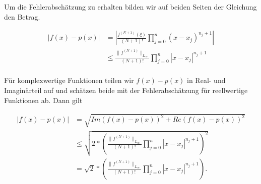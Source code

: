 \documentclass[]{article}
\begin{document}
Um die Fehlerabschätzung zu erhalten bilden wir auf beiden Seiten der Gleichung den Betrag.

\begin{align*}
	|f(x)-p(x)| &= \left| \frac{f^{(N+1)}(\xi)}{(N+1)!} \prod_{j=0}^{n}(x-x_j)^{n_j+1}\right| \\
	& \leq \frac{\|f^{(N+1)}\|_{L_\infty}}{(N+1)!} \prod_{j=0}^{n}|x-x_j|^{n_j+1} \\
\end{align*}

Für komplexwertige Funktionen teilen wir $f(x)-p(x)$ in Real- und Imaginärteil auf und schätzen beide mit der Fehlerabschätzung für reellwertige Funktionen ab. Dann gilt

\begin{align*}
	|f(x)-p(x)| &= \sqrt{Im(f(x)-p(x))^2 + Re(f(x)-p(x))^2} \\
	 & \leq \sqrt{2*\left(\frac{\|f^{(N+1)}\|_{L_\infty}}{(N+1)!} \prod_{j=0}^{n}|x-x_j|^{n_j+1}\right)^2} \\
	 &= \sqrt{2} * \left(\frac{\|f^{(N+1)}\|_{L_\infty}}{(N+1)!} \prod_{j=0}^{n}|x-x_j|^{n_j+1}\right). \\
\end{align*}
\end{document}
